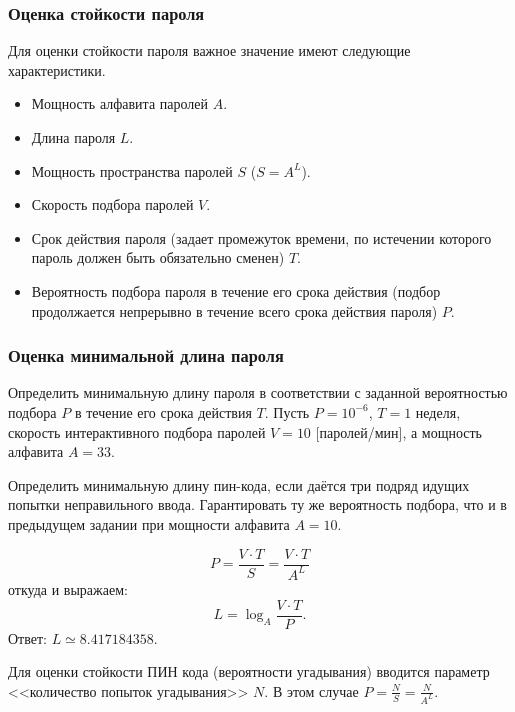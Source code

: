 \begin{frame}
\frametitle{Оценка стойкости пароля}
Для оценки стойкости пароля важное значение имеют следующие характеристики.
\begin{itemize}
    \item Мощность алфавита паролей $A$.
    \item Длина пароля $L$.
    \item Мощность пространства паролей $S$ ($S = A^L$).
    \item Скорость подбора паролей $V$.
    \item Срок действия пароля (задает промежуток времени, по истечении которого пароль должен быть обязательно сменен) $T$.
    \item Вероятность подбора пароля в течение его срока действия (подбор продолжается непрерывно в течение всего срока действия пароля) $P$.
\end{itemize}
\end{frame}

\begin{frame}
    \frametitle{Оценка минимальной длина пароля}
    
    \begin{example}
        Определить минимальную длину пароля в соответствии с заданной вероятностью подбора $P$ в течение его срока действия $T$. Пусть $P=10^{-6}$, $T=1$ неделя, скорость интерактивного подбора паролей $V=10$ [паролей/мин], а мощность алфавита $A=33$.
    \end{example}
    \begin{example}
        Определить минимальную длину пин-кода, если даётся три подряд идущих попытки неправильного ввода. Гарантировать ту же вероятность подбора, что и в предыдущем задании при мощности алфавита $A=10$.
    \end{example}
\end{frame}

\[P=\frac{V\cdot T}{S}=\frac{V\cdot T}{A^L}\]
откуда и выражаем:
\[L=\log_{A}\frac{V\cdot T}{P}.\]
Ответ: $L\simeq 8.417184358$.


Для оценки стойкости ПИН кода (вероятности угадывания) вводится параметр <<количество попыток угадывания>> $N$. В этом случае $P=\frac{N}{S}=\frac{N}{A^L}$.


